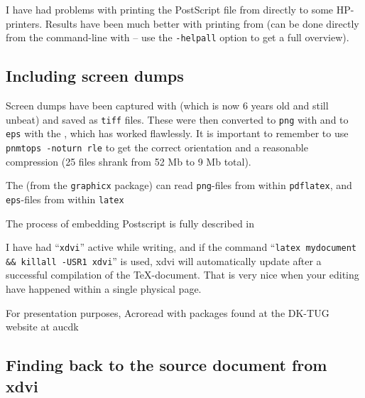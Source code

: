 I have had problems with printing the PostScript file from
 directly to some HP-printers.  Results have been
much better with printing from
 (can be done directly from the command-line with
 -- use the
\texttt{-helpall} option to get a full overview).


\subsection{Including screen dumps}
\label{sec:report-writing-tools-latex-eps}

Screen dumps have been captured with
(which is now 6 years old and still unbeat) and saved as \texttt{tiff}
files.  These were then converted to \texttt{png} with
 and to \texttt{eps} with the
, which has worked flawlessly.  It is important to remember
to use \texttt{pnmtops -noturn rle} to get the correct orientation and
a reasonable compression (25 files shrank from 52 Mb to 9 Mb total).

The  (from the \texttt{graphicx} package)
can read \texttt{png}-files from within \texttt{pdflatex}, and
\texttt{eps}-files from within \texttt{latex}


The process of embedding Postscript is fully described in
~\cite{goosens-rahtz-mittelbach:the-latex-graphics-companion}


I have had ``\texttt{xdvi}'' active while writing, and if the command
``\texttt{latex mydocument \&\& killall -USR1 xdvi}'' is used, xdvi
will automatically update after a successful compilation of the
TeX-document.  That is very nice when your editing have happened
within a single physical page.

For presentation purposes, \textsf{Acroread with packages found at the
  DK-TUG website at aucdk}

\subsection{Finding back to the source document from xdvi}

